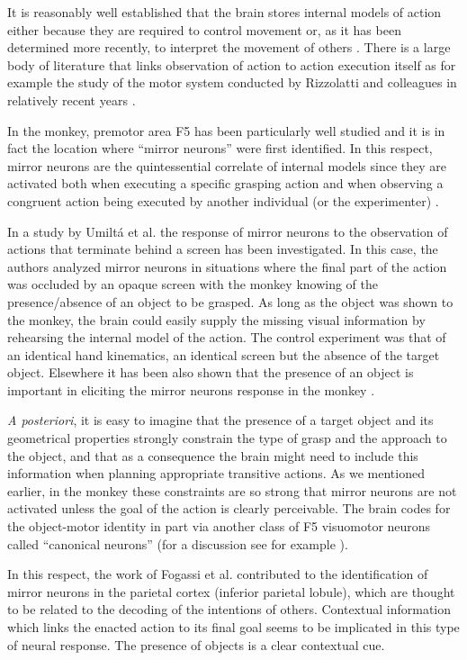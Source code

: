 It is reasonably well established that the brain stores internal models of action
either because they are required to control movement or, as it has been determined
more recently, to interpret the movement of others \cite{kawato-99}. There is a large body of 
literature that links observation of action to action execution itself as for 
example the study of the motor system conducted by Rizzolatti and colleagues in 
relatively recent years \cite{rizzolatti-04,gallese-96,rizzolatti-01}. 

In the monkey, premotor area F5 has been particularly well studied and it is in fact the 
location where ``mirror neurons'' were first identified. In this respect, mirror neurons 
are the quintessential correlate of internal models since they are activated 
both when executing a specific grasping action and when observing a congruent action 
being executed by another individual (or the experimenter) \cite{fadiga-00}.

In a study by Umilt\'a et al. \cite{umilta-01} the response of mirror neurons to the observation of
actions that terminate behind a screen has been investigated. In this case, the authors analyzed 
mirror neurons in situations where the final part of the action was occluded by an opaque 
screen with the monkey knowing of the presence/absence of an object to be grasped. As long
as the object was shown to the monkey, the brain could easily supply the missing
visual information by rehearsing the internal model of the action. The control experiment was that
of an identical hand kinematics, an identical screen but the absence of the target object.
Elsewhere it has been also shown that the presence of an object is important in eliciting the 
mirror neurons response in the monkey \cite{gallese-96}.

{\em A posteriori}, it is easy to imagine that the presence of a target object and its geometrical 
properties strongly constrain the type of grasp and the approach to the object, and that as a consequence 
the brain might need to include this information when planning appropriate transitive actions. 
As we mentioned earlier, in the monkey these constraints are so strong that mirror neurons are not 
activated unless the goal of the action is clearly perceivable. The brain codes for the object-motor 
identity in part via another class of F5 visuomotor neurons called ``canonical neurons'' (for a 
discussion see for example \cite{metta-06}). 

In this respect, the work of Fogassi et al. \cite{fogassi-05} contributed to the identification of mirror
neurons in the parietal cortex (inferior parietal lobule), which are thought to be related to the 
decoding of the intentions of others. Contextual information which links the enacted action to its
final goal seems to be implicated in this type of neural response. The presence of objects is 
a clear contextual cue.

